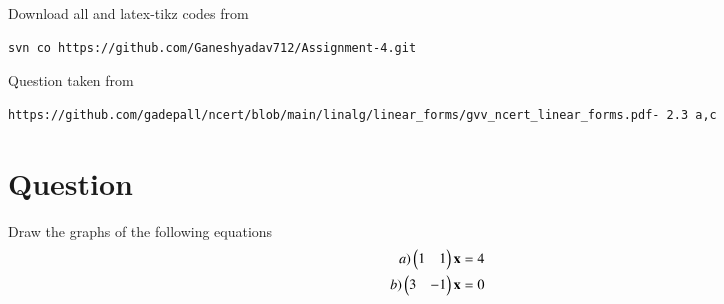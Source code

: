 \documentclass[journal,12pt,twocolumn]{IEEEtran}
\begin{document}
\newpage
\bigskip
\renewcommand{\thefigure}{\theenumi}
\renewcommand{\thetable}{\theenumi}
%
Download all and latex-tikz codes from 
%
\begin{lstlisting}
svn co https://github.com/Ganeshyadav712/Assignment-4.git
\end{lstlisting}
%
Question taken from
\begin{lstlisting}
https://github.com/gadepall/ncert/blob/main/linalg/linear_forms/gvv_ncert_linear_forms.pdf- 2.3 a,c  
\end{lstlisting}
%
\section{Question}
Draw the graphs of the following equations
\begin{align}
  a) \begin{pmatrix}1&1\end{pmatrix}\mathbf{x}&=4\\
  b) \begin{pmatrix}3&-1\end{pmatrix}\mathbf{x}&=0
\end{align}
\end{document}
